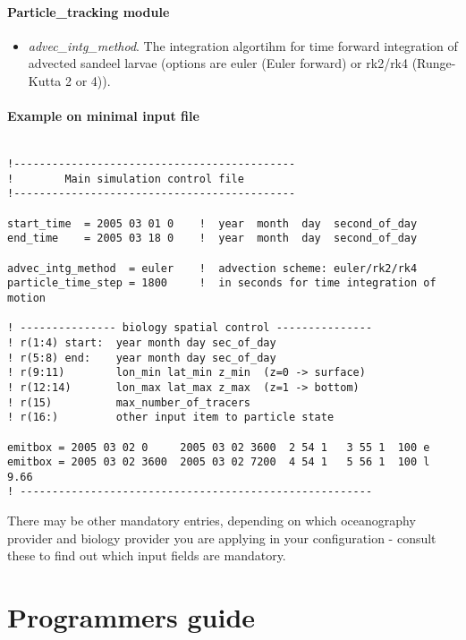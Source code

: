 \subsection{Particle\_tracking module}
\begin{itemize}
  \item {\em advec\_intg\_method}. The integration algortihm for time forward integration
        of advected sandeel larvae (options are euler (Euler forward) or rk2/rk4 (Runge-Kutta 2 or 4)).
\end{itemize}

\subsection{Example on minimal input file}
{\small 
\begin{verbatim}

!--------------------------------------------
!        Main simulation control file 
!--------------------------------------------

start_time  = 2005 03 01 0    !  year  month  day  second_of_day
end_time    = 2005 03 18 0    !  year  month  day  second_of_day

advec_intg_method  = euler    !  advection scheme: euler/rk2/rk4
particle_time_step = 1800     !  in seconds for time integration of motion

! --------------- biology spatial control ---------------
! r(1:4) start:  year month day sec_of_day
! r(5:8) end:    year month day sec_of_day
! r(9:11)        lon_min lat_min z_min  (z=0 -> surface)
! r(12:14)       lon_max lat_max z_max  (z=1 -> bottom)
! r(15)          max_number_of_tracers
! r(16:)         other input item to particle state

emitbox = 2005 03 02 0     2005 03 02 3600  2 54 1   3 55 1  100 e 
emitbox = 2005 03 02 3600  2005 03 02 7200  4 54 1   5 56 1  100 l 9.66
! -------------------------------------------------------
\end{verbatim}
}

There may be other mandatory entries, depending on which 
oceanography provider and biology provider you are applying in your 
configuration - consult these to find out which input fields are mandatory.


\part{Programmers guide}


